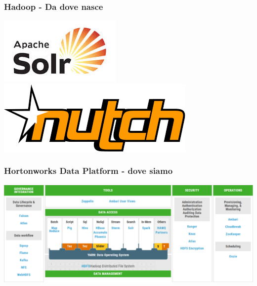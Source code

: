 \begin{frame}[t]
\frametitle{Hadoop - Da dove nasce}

\begin{center}
	\includegraphics[scale=0.45]{img/solr-logo}\\
	
	\includegraphics[scale=0.45]{img/nutch-logo}
\end{center}

\end{frame}

\begin{frame}[t]
\frametitle{Hortonworks Data Platform - dove siamo}

\begin{center}
	\includegraphics[scale=0.45]{img/HDP_25}
\end{center}

\end{frame}




